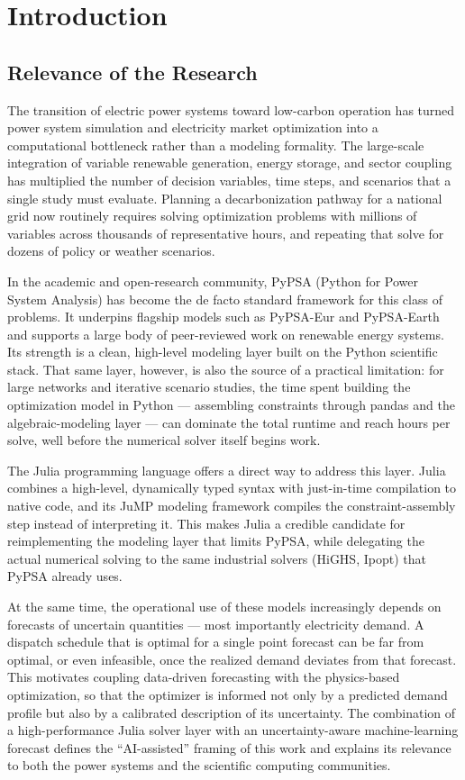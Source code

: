 \chapter*{Introduction}

\section*{Relevance of the Research}

The transition of electric power systems toward low-carbon operation has turned power system simulation and electricity market optimization into a computational bottleneck rather than a modeling formality. The large-scale integration of variable renewable generation, energy storage, and sector coupling has multiplied the number of decision variables, time steps, and scenarios that a single study must evaluate. Planning a decarbonization pathway for a national grid now routinely requires solving optimization problems with millions of variables across thousands of representative hours, and repeating that solve for dozens of policy or weather scenarios.

In the academic and open-research community, PyPSA (Python for Power System Analysis) has become the de facto standard framework for this class of problems. It underpins flagship models such as PyPSA-Eur and PyPSA-Earth and supports a large body of peer-reviewed work on renewable energy systems. Its strength is a clean, high-level modeling layer built on the Python scientific stack. That same layer, however, is also the source of a practical limitation: for large networks and iterative scenario studies, the time spent building the optimization model in Python --- assembling constraints through pandas and the algebraic-modeling layer --- can dominate the total runtime and reach hours per solve, well before the numerical solver itself begins work.

The Julia programming language offers a direct way to address this layer. Julia combines a high-level, dynamically typed syntax with just-in-time compilation to native code, and its JuMP modeling framework compiles the constraint-assembly step instead of interpreting it. This makes Julia a credible candidate for reimplementing the modeling layer that limits PyPSA, while delegating the actual numerical solving to the same industrial solvers (HiGHS, Ipopt) that PyPSA already uses.

At the same time, the operational use of these models increasingly depends on forecasts of uncertain quantities --- most importantly electricity demand. A dispatch schedule that is optimal for a single point forecast can be far from optimal, or even infeasible, once the realized demand deviates from that forecast. This motivates coupling data-driven forecasting with the physics-based optimization, so that the optimizer is informed not only by a predicted demand profile but also by a calibrated description of its uncertainty. The combination of a high-performance Julia solver layer with an uncertainty-aware machine-learning forecast defines the ``AI-assisted'' framing of this work and explains its relevance to both the power systems and the scientific computing communities.

